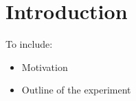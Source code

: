 \section{Introduction}
\label{Sect:Intro}

To include:
\begin{itemize}
  \item Motivation
  \item Outline of the experiment
\end{itemize}
